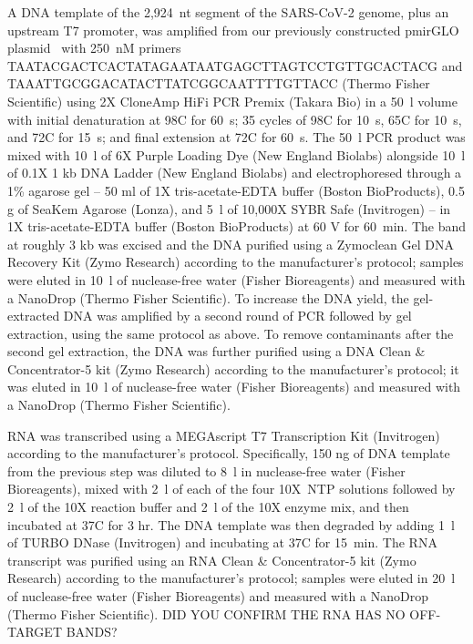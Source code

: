 \documentclass[main.tex]{subfiles}
\begin{document}
A DNA template of the 2,924~nt segment of the SARS-CoV-2 genome, plus an upstream T7 promoter, was amplified from our previously constructed pmirGLO plasmid~\cite{Lan2022} with 250~nM primers TAATACGACTCACTATAGAATAATGAGCTTAGTCCTGTTGCACTACG and TAAATTGCGGACATACTTATCGGCAATTTTGTTACC (Thermo Fisher Scientific) using 2X CloneAmp HiFi PCR Premix (Takara Bio) in a 50~\textmu l volume with initial denaturation at 98\textdegree C for 60~s; 35 cycles of 98\textdegree C for 10~s, 65\textdegree C for 10~s, and 72\textdegree C for 15~s; and final extension at 72\textdegree C for 60~s.
The 50~\textmu l PCR product was mixed with 10~\textmu l of 6X Purple Loading Dye (New England Biolabs) alongside 10~\textmu l of 0.1X 1 kb DNA Ladder (New England Biolabs) and electrophoresed through a 1\% agarose gel -- 50 ml of 1X tris-acetate-EDTA buffer (Boston BioProducts), 0.5 g of SeaKem Agarose (Lonza), and 5~\textmu l of 10,000X SYBR Safe (Invitrogen) -- in 1X tris-acetate-EDTA buffer (Boston BioProducts) at 60 V for 60~min.
The band at roughly 3 kb was excised and the DNA purified using a Zymoclean Gel DNA Recovery Kit (Zymo Research) according to the manufacturer's protocol; samples were eluted in 10~\textmu l of nuclease-free water (Fisher Bioreagents) and measured with a NanoDrop (Thermo Fisher Scientific).
To increase the DNA yield, the gel-extracted DNA was amplified by a second round of PCR followed by gel extraction, using the same protocol as above.
To remove contaminants after the second gel extraction, the DNA was further purified using a DNA Clean \& Concentrator-5 kit (Zymo Research) according to the manufacturer's protocol; it was eluted in 10~\textmu l of nuclease-free water (Fisher Bioreagents) and measured with a NanoDrop (Thermo Fisher Scientific).

RNA was transcribed using a MEGAscript T7 Transcription Kit (Invitrogen) according to the manufacturer's protocol.
Specifically, 150 ng of DNA template from the previous step was diluted to 8~\textmu l in nuclease-free water (Fisher Bioreagents), mixed with 2~\textmu l of each of the four 10X~NTP solutions followed by 2~\textmu l of the 10X reaction buffer and 2~\textmu l of the 10X enzyme mix, and then incubated at 37\textdegree C for 3 hr.
The DNA template was then degraded by adding 1~\textmu l of TURBO DNase (Invitrogen) and incubating at 37\textdegree C for 15~min.
The RNA transcript was purified using an RNA Clean \& Concentrator-5 kit (Zymo Research) according to the manufacturer's protocol; samples were eluted in 20~\textmu l of nuclease-free water (Fisher Bioreagents) and measured with a NanoDrop (Thermo Fisher Scientific).
DID YOU CONFIRM THE RNA HAS NO OFF-TARGET BANDS?
\end{document}
